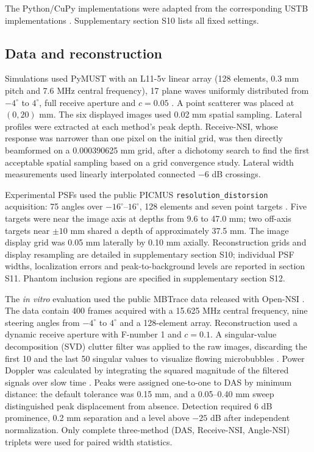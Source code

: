 \documentclass{iopjournal}
\providecommand{\revstart}{}
\providecommand{\revstop}{}
\begin{document}
The Python/CuPy implementations were adapted from the corresponding USTB implementations \citep{rodriguez-molares_ultrasound_2017}.
Supplementary section S10 lists all fixed settings.\revstop

\subsection{Data and reconstruction}

Simulations used PyMUST with an L11-5v linear array (128 elements, 0.3 mm pitch
and 7.6 MHz central frequency), 17 plane waves uniformly distributed from
$-4^\circ$ to $4^\circ$, full receive aperture and $c=0.05$
\citep{garcia2021must,bernardino_pymust_2024}. A point scatterer was placed at
$(0,20)$ mm. \revstart The six displayed images used 0.02 mm spatial sampling. Lateral profiles were extracted at each method's peak depth. Receive-NSI, whose
response was narrower than one pixel on the initial grid, was then directly beamformed on a 0.000390625 mm grid, after a dichotomy search to find the first acceptable spatial sampling based on a grid convergence study. Lateral width measurements used linearly interpolated connected $-6$ dB crossings.\revstop

\revstart Experimental PSFs used the public PICMUS
\texttt{resolution\_distorsion} acquisition: 75 angles over
$-16^\circ$--$16^\circ$, 128 elements and seven point targets
\citep{liebgott_plane-wave_2016}. Five targets were near the image axis at
depths from 9.6 to 47.0 mm; two off-axis targets near $\pm10$ mm shared a depth
of approximately 37.5 mm. The image display grid was 0.05 mm laterally
by 0.10 mm axially. Reconstruction grids and display resampling are detailed in supplementary section S10; individual PSF widths, localization errors and peak-to-background levels are reported in section S11. Phantom inclusion
regions are specified in supplementary section S12.\revstop

The \textit{in vitro} evaluation used the public MBTrace data released with
Open-NSI \citep{kou2024highresolution}. The data contain 400 frames acquired
with a 15.625 MHz central frequency, nine steering angles from $-4^\circ$ to
$4^\circ$ and a 128-element array. Reconstruction used a dynamic receive
aperture with F-number 1 and $c=0.1$. A singular-value decomposition (SVD)
clutter filter was applied to the raw images, discarding the first 10 and the
last 50 singular values to visualize flowing microbubbles 
\citep{demene2015spatiotemporal}. Power Doppler was
calculated by integrating the squared magnitude of the filtered signals over slow time \citep{rubin_fractional_1995}.  Peaks were assigned one-to-one to DAS by
minimum distance: \revstart the default tolerance was 0.15 mm, and a
0.05--0.40 mm sweep distinguished peak displacement from absence. Detection required
6 dB prominence, 0.2 mm separation and a level above $-25$ dB after independent
normalization. Only complete three-method (DAS, Receive-NSI, Angle-NSI) triplets were used for paired width
statistics.\revstop
\end{document}

